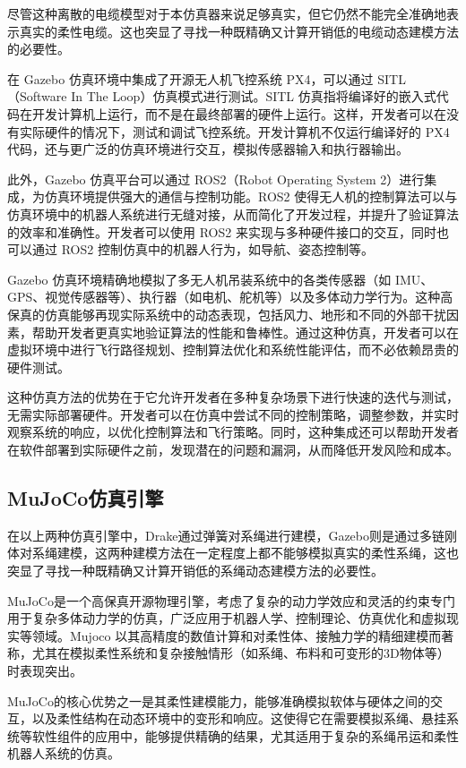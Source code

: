 \documentclass[lang=chs, degree=master, blindreview=false, winfonts=true]{yanputhesis}
\begin{document}
尽管这种离散的电缆模型对于本仿真器来说足够真实，但它仍然不能完全准确地表示真实的柔性电缆。这也突显了寻找一种既精确又计算开销低的电缆动态建模方法的必要性。

在 Gazebo 仿真环境中集成了开源无人机飞控系统 PX4，可以通过 SITL（Software In The Loop）仿真模式进行测试。SITL 仿真指将编译好的嵌入式代码在开发计算机上运行，而不是在最终部署的硬件上运行。这样，开发者可以在没有实际硬件的情况下，测试和调试飞控系统。开发计算机不仅运行编译好的 PX4 代码，还与更广泛的仿真环境进行交互，模拟传感器输入和执行器输出。

此外，Gazebo 仿真平台可以通过 ROS2（Robot Operating System 2）进行集成，为仿真环境提供强大的通信与控制功能。ROS2 使得无人机的控制算法可以与仿真环境中的机器人系统进行无缝对接，从而简化了开发过程，并提升了验证算法的效率和准确性。开发者可以使用 ROS2 来实现与多种硬件接口的交互，同时也可以通过 ROS2 控制仿真中的机器人行为，如导航、姿态控制等。

Gazebo 仿真环境精确地模拟了多无人机吊装系统中的各类传感器（如 IMU、GPS、视觉传感器等）、执行器（如电机、舵机等）以及多体动力学行为。这种高保真的仿真能够再现实际系统中的动态表现，包括风力、地形和不同的外部干扰因素，帮助开发者更真实地验证算法的性能和鲁棒性。通过这种仿真，开发者可以在虚拟环境中进行飞行路径规划、控制算法优化和系统性能评估，而不必依赖昂贵的硬件测试。

这种仿真方法的优势在于它允许开发者在多种复杂场景下进行快速的迭代与测试，无需实际部署硬件。开发者可以在仿真中尝试不同的控制策略，调整参数，并实时观察系统的响应，以优化控制算法和飞行策略。同时，这种集成还可以帮助开发者在软件部署到实际硬件之前，发现潜在的问题和漏洞，从而降低开发风险和成本。

\subsection{MuJoCo仿真引擎}

在以上两种仿真引擎中，Drake通过弹簧对系绳进行建模，Gazebo则是通过多链刚体对系绳建模，这两种建模方法在一定程度上都不能够模拟真实的柔性系绳，这也突显了寻找一种既精确又计算开销低的系绳动态建模方法的必要性。

MuJoCo是一个高保真开源物理引擎，考虑了复杂的动力学效应和灵活的约束专门用于复杂多体动力学的仿真，广泛应用于机器人学、控制理论、仿真优化和虚拟现实等领域。Mujoco 以其高精度的数值计算和对柔性体、接触力学的精细建模而著称，尤其在模拟柔性系统和复杂接触情形（如系绳、布料和可变形的3D物体等）时表现突出。

MuJoCo的核心优势之一是其柔性建模能力，能够准确模拟软体与硬体之间的交互，以及柔性结构在动态环境中的变形和响应。这使得它在需要模拟系绳、悬挂系统等软性组件的应用中，能够提供精确的结果，尤其适用于复杂的系绳吊运和柔性机器人系统的仿真。
\end{document}
